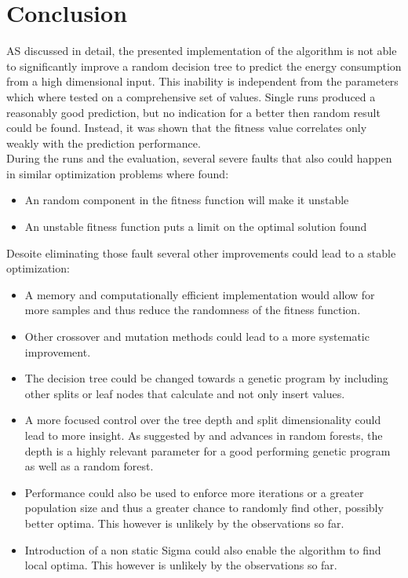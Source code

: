 \documentclass[conference]{IEEEtran}
\begin{document}
\section{Conclusion}
AS discussed in detail, the presented implementation of the algorithm is not able to significantly improve a random decision tree to predict the energy consumption from a high dimensional input. This inability is independent from the parameters which where tested on a comprehensive set of values. Single runs produced a reasonably good prediction, but no indication for a better then random result could be found.
Instead, it was shown that the fitness value correlates only weakly with the prediction performance.\\
During the runs and the evaluation, several severe faults that also could happen in similar optimization problems where found:

\begin{itemize}
\item An random component in the fitness function will make it unstable
\item An unstable fitness function puts a limit on the optimal solution found
\end{itemize}

Desoite eliminating those fault several other improvements could lead to a stable optimization:

\begin{itemize}
\item  A memory and computationally efficient implementation would allow for more samples and thus reduce the randomness of the fitness function.
\item Other crossover and mutation methods could lead to a more systematic improvement.
\item The decision tree could be changed towards a genetic program by including other splits or leaf nodes that calculate and not only insert values.
\item A more focused control over the tree depth and split dimensionality could lead to more insight. As suggested by \cite{gathercole1996adverse} and advances in random forests, the depth is a highly relevant parameter for a good performing genetic program as well as a random forest.
\item Performance could also be used to enforce more iterations or a greater population size and thus a greater chance to randomly find other, possibly better optima.  This however is unlikely by the observations so far.
\item Introduction of a non static Sigma could also enable the algorithm to find local optima. This however is unlikely by the observations so far.
\end{itemize}
\end{document}
